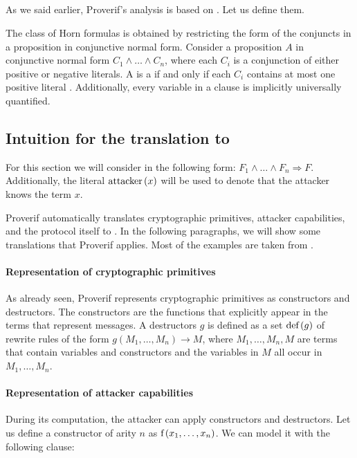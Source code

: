 \subsection{\Horncs{}}

As we said earlier, Proverif's analysis is based on \Horncs{}. Let us define them.

The class of Horn formulas is obtained by restricting the form of the conjuncts in a proposition in conjunctive normal form. Consider a proposition $A$ in conjunctive normal form $C_1 \land \ldots \land C_n$, where each $C_i$ is a conjunction of either positive or negative literals. A is a \Hornc{} if and only if each $C_i$ contains at most one positive literal \cite{DOWLING1984267,horn_1951}. Additionally, every variable in a clause is implicitly universally quantified.


\subsection{Intuition for the translation to \Horncs{}}
For this section we will consider \Horncs{} in the following form: $F_1 \land \ldots \land F_n \Rightarrow F$.
Additionally, the literal $\mbox{attacker}\left(x\right)$ will be used to denote that the attacker knows the term $x$.

Proverif automatically translates cryptographic primitives, attacker capabilities, and the protocol itself to \Horncs{}. In the following paragraphs, we will show some translations that Proverif applies. Most of the examples are taken from \BLANC{} \cite{blanchet:hal-01110425}.

\paragraph{Representation of cryptographic primitives}
As already seen, Proverif represents cryptographic primitives as constructors and destructors. The constructors are the functions that explicitly appear in the terms that represent messages. A destructors $g$ is defined as a set $\mbox{def}\left(g\right)$ of rewrite rules of the form $g\left(M_1, \ldots, M_n\right) \rightarrow M$, where $M_1, \ldots, M_n, M$ are terms that contain variables and constructors and the variables in $M$ all occur in $M_1, \ldots, M_n$.


\paragraph{Representation of attacker capabilities}
During its computation, the attacker can apply constructors and destructors. Let us define a constructor of arity $n$ as $\mbox{f}\left(x_1, \ldots, x_n\right)$. We can model it with the following clause:

